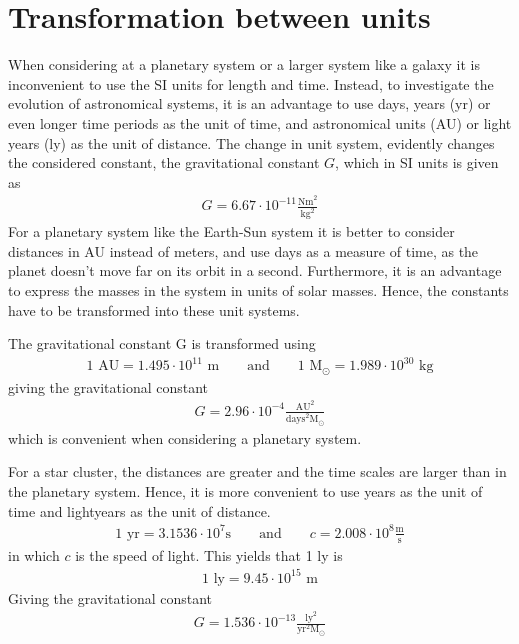 \section{Transformation between units}
\label{sec:Conversion}
When considering at a planetary system or a larger system like a galaxy it is inconvenient to use the SI units for length and time.
Instead, to investigate the evolution of astronomical systems, it is an advantage to use days, years (yr) or even longer time periods as the unit of time, and astronomical units (AU) or light years (ly) as the unit of distance.
The change in unit system, evidently changes the considered constant, the gravitational constant $G$, which in SI units is given as
\begin{align}
	G = 6.67\cdot 10^{-11} \frac{\textrm{Nm}^2}{\textrm{kg}^2}
\end{align}
For a planetary system like the Earth-Sun system it is better to consider distances in AU instead of meters, and use days as a measure of time, as the planet doesn't move far on its orbit in a second.
Furthermore, it is an advantage to express the masses in the system in units of solar masses. 
Hence, the constants have to be transformed into these unit systems. 

The gravitational constant G is transformed using
\begin{align}
	1 \textrm{ AU} = 1.495\cdot10^{11} \textrm{ m}
	\qquad \text{and} \qquad
	1 \textrm{ M}_{\odot} = 1.989 \cdot 10^{30} \textrm{ kg}
\end{align}
giving the gravitational constant
\begin{align}
	G = 2.96\cdot 10^{-4} \frac{\textrm{AU}^2}{\textrm{days}^2 \textrm{M}_{\odot}}
\end{align}
which is convenient when considering a planetary system.
 
For a star cluster, the distances are greater and the time scales are larger than in the planetary system.
Hence, it is more convenient to use years as the unit of time and lightyears as the unit of distance. 
\begin{align}
	1 \textrm{ yr} = 3.1536\cdot10^7\textrm{s}
	\qquad \text{and} \qquad
	c = 2.008\cdot 10^8 \frac{\textrm{m}}{\textrm{s}}
\end{align}
in which $c$ is the speed of light.
This yields that 1 ly is
\begin{align}
	1 \textrm{ ly} = 9.45 \cdot 10^15 \textrm{ m}
\end{align}
Giving the gravitational constant
\begin{align}
	G = 1.536\cdot 10^{-13} \frac{\textrm{ly}^2}{\textrm{yr}^2 {\textrm{M}}_{\odot}}
\end{align}


